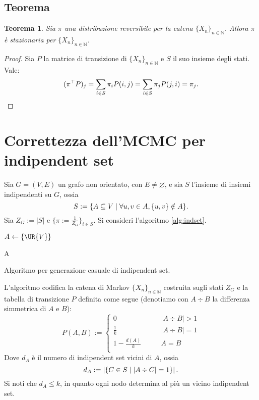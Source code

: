 \documentclass{article}
\theoremstyle{plain}
\newtheorem{thm}{Teorema}
\newcommand{\asn}{\leftarrow}
\newcommand{\N}{\mathbb N}
\newcommand{\tra}{^\top}
\newcommand{\chain}[1]{\{#1_n\}_{n\in\N}}
\newcommand{\card}[1]{\left|#1\right|}
\renewcommand{\emptyset}{\varnothing}
\begin{document}
\subsection{Teorema}

\begin{thm}
	Sia $\pi$ una distribuzione reversibile per la catena $\chain{X}$. Allora $\pi$ è stazionaria per $\chain X$.
\end{thm}
\begin{proof}
	Sia $P$ la matrice di transizione di $\chain X$ e $S$ il suo insieme degli stati. Vale:
	\begin{equation*}
		(\pi\tra P)_j = \sum_{i\in S} \pi_i P(i,j) = \sum_{i\in S} \pi_j P(j,i) = \pi_j \text. \qedhere
	\end{equation*}
\end{proof}



\section{Correttezza dell'MCMC per indipendent set}

Sia $G=(V,E)$ un grafo non orientato, con $E\ne\emptyset$, e sia $S$ l'insieme di insiemi indipendenti su $G$, ossia
\begin{equation*}
	S := \{A\subseteq V\mid \forall u,v\in A, \{u,v\}\notin A\} \text.
\end{equation*}
Sia $Z_G:=\card S$ e $\{\pi:=\frac{1}{Z_G}\}_{i\in S}$. Si consideri l'algoritmo \ref{alg:indset}.

\begin{algorithm}
	\DontPrintSemicolon

	$A\asn\{\UR{V}\}$

	\For{$n$ volte}{
		$V\asn\UR{V}$ \;
		\If{$V\in A$}{
			$A\asn A\setminus\{v\}$ \;
		}\ElseIf{$\forall z\in A\quad \{z,v\}\notin E$}{
			$A\asn A\cup\{v\}$ \;
		}
	}
	\Return A

	\caption{Algoritmo per generazione casuale di indipendent set.}
	\label{alg:indset}
\end{algorithm}

L'algoritmo codifica la catena di Markov $\chain X$ costruita sugli stati $Z_G$ e la tabella di transizione $P$ definita come segue (denotiamo con $A\div B$ la differenza simmetrica di $A$ e $B$):
\begin{equation*}
	P(A,B):=\begin{cases}
		0                  & \qquad \card{A\div B}>1 \\
		\frac 1 k          & \qquad \card{A\div B}=1 \\
		1 - \frac{d(A)}{k} & \qquad A=B              \\
	\end{cases}
\end{equation*}
Dove $d_A$ è il numero di indipendent set vicini di $A$, ossia
\begin{equation*}
	d_A:=\card{\{C\in S\mid \card{A\div C}=1\}} \text.
\end{equation*}
Si noti che $d_A\le k$, in quanto ogni nodo determina al più un vicino indipendent set.
\end{document}
